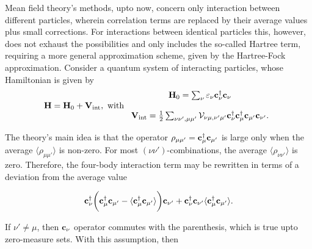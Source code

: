 \documentclass{homework}
\begin{document}
Mean field theory's methods, upto now, concern only interaction between different particles, wherein correlation terms are replaced by their average values plus small corrections. For interactions between identical particles this, however, does not exhaust the possibilities and only includes the so-called Hartree term, requiring a more general approximation scheme, given by the Hartree-Fock approximation. Consider a quantum system of interacting particles, whose Hamiltonian is given by 
\begin{equation}
    {\bf H} = {\bf H}_0 + {\bf V}_{\textnormal{int}}, \textnormal{ with } \begin{array}{c}
         {\bf H}_0 = \sum_{\nu} \varepsilon_{\nu} {\bf c}_{\nu}^\dagger {\bf c}_{\nu}\\
         \\
         {\bf V}_{\textnormal{int}}  = \frac{1}{2} \sum_{\nu\nu', \mu\mu'} {\mathcal V}_{\nu\mu, \nu'\mu'} {\bf c}_{\nu}^\dagger {\bf c}_{\mu}^\dagger {\bf c}_{\mu'} {\bf c}_{\nu'}.\\
    \end{array}
\end{equation}

The theory's main idea is that the operator $\rho_{\mu \mu'} = {\bf c}_{\mu}^\dagger {\bf c}_{\mu'}$ is large only when the average $\langle \rho_{\mu \mu'} \rangle$ is non-zero. For most $(\nu \nu')$-combinations, the average $\langle \rho_{\nu \nu'} \rangle$ is zero. Therefore, the four-body interaction term may be rewritten in terms of a deviation from the average value

$$
    {\bf c}_{\nu}^\dagger \bigg({\bf c}_{\mu}^\dagger {\bf c}_{\mu'} - \langle {\bf c}_{\mu}^\dagger {\bf c}_{\mu'} \rangle \bigg) {\bf c}_{\nu'} + {\bf c}_{\nu}^\dagger {\bf c}_{\nu'} \langle {\bf c}_{\mu}^\dagger {\bf c}_{\mu'}\rangle.
$$

If $\nu' \neq \mu$, then ${\bf c}_{\nu}$ operator commutes with the parenthesis, which is true upto zero-measure sets. With this assumption, then
\end{document}

